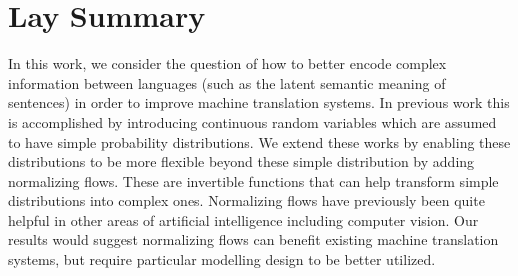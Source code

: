 

\chapter{Lay Summary}

In this work, we consider the question of how to better encode complex information between languages (such as the latent semantic meaning of sentences) in order to improve machine translation systems. In previous work this is accomplished by introducing continuous random variables which are assumed to have simple probability distributions. We extend these works by enabling these distributions to be more flexible beyond these simple distribution by adding normalizing flows. These are invertible functions that can help transform simple distributions into complex ones. Normalizing flows have previously been quite helpful in other areas of artificial intelligence including computer vision. Our results would suggest normalizing flows can benefit existing machine translation systems, but require particular modelling design to be better utilized. 

